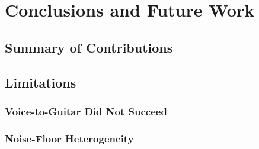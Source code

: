 \chapter{Conclusions and Future Work}
\label{ch:conclusions}

\section{Summary of Contributions}
\label{sec:conclusions_summary}

%
%
%

\section{Limitations}
\label{sec:conclusions_limitations}

\subsection{Voice-to-Guitar Did Not Succeed}

\subsection{Noise-Floor Heterogeneity}

